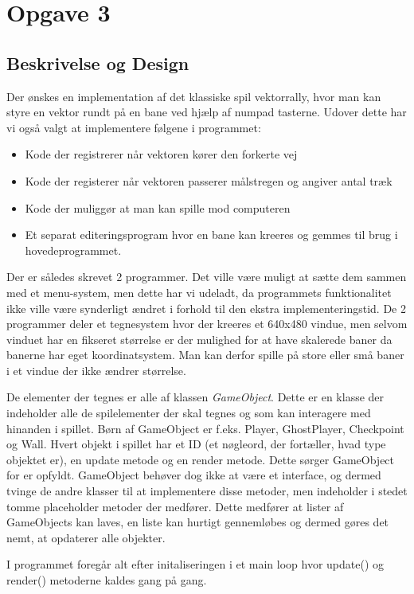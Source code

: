 \section{Opgave 3}
\subsection{Beskrivelse og Design}
Der ønskes en implementation af det klassiske spil vektorrally,
hvor man kan styre en vektor rundt på en bane ved hjælp af numpad tasterne.
Udover dette har vi også valgt at implementere følgene i programmet:
\begin{itemize}
  \item Kode der registrerer når vektoren kører den forkerte vej
  \item Kode der registerer når vektoren passerer målstregen og angiver antal træk
  \item Kode der muliggør at man kan spille mod computeren
  \item Et separat editeringsprogram hvor en bane kan kreeres og gemmes til brug i hovedeprogrammet.
\end{itemize}
Der er således skrevet 2 programmer. Det ville være muligt at sætte dem sammen med et menu-system,
men dette har vi udeladt, da programmets funktionalitet ikke ville være synderligt ændret i forhold til den ekstra implementeringstid.
De 2 programmer deler et tegnesystem hvor der kreeres et 640x480 vindue,
men selvom vinduet har en fikseret størrelse er der mulighed for at have skalerede baner da banerne har eget koordinatsystem.
Man kan derfor spille på store eller små baner i et vindue der ikke ændrer størrelse.

De elementer der tegnes er alle af klassen \emph{GameObject}. %
Dette er en klasse der indeholder alle de spilelementer der skal tegnes og som kan interagere med hinanden i spillet.
Børn af GameObject er f.eks. Player, GhostPlayer, Checkpoint og Wall. Hvert objekt i spillet har et ID
(et nøgleord, der fortæller, hvad type objektet er), en update metode og en render metode.
Dette sørger GameObject for er opfyldt. GameObject behøver dog ikke at være et interface,
og dermed tvinge de andre klasser til at implementere disse metoder,
men indeholder i stedet tomme placeholder metoder der medfører.
Dette medfører at lister af GameObjects kan laves,
en liste kan hurtigt gennemløbes og dermed gøres det nemt, at opdaterer alle objekter.

I programmet foregår alt efter initaliseringen  i et main loop hvor update() og render() metoderne kaldes gang på gang.

